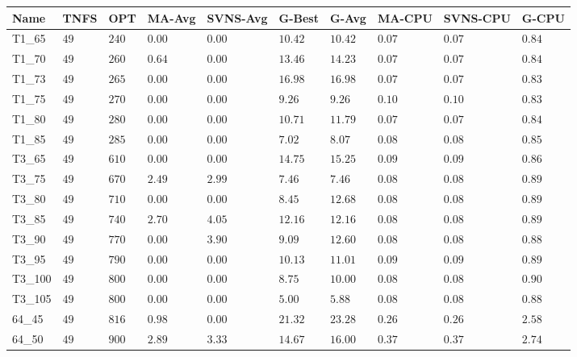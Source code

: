 \begin{center}
\begin{table}[]
\centering
\begin{tabular}{|lll|l|l|ll|lll|}
\hline
Name    & TNFS    & OPT    & MA-Avg &SVNS-Avg& G-Best  & G-Avg   & MA-CPU & SVNS-CPU & G-CPU \\
\hline
T1\_65   & $49  $ & $240 $ & $\bm{0.00}$ & $\bm{0.00}$ & $10.42$ & $10.42$ & $0.07$ & $0.07$   & $0.84$ \\
T1\_70   & $49  $ & $260 $ & $0.64$ & $\bm{0.00}$ & $13.46$ & $14.23$ & $0.07$ & $0.07$   & $0.84$ \\
T1\_73   & $49  $ & $265 $ & $\bm{0.00}$ & $\bm{0.00}$ & $16.98$ & $16.98$ & $0.07$ & $0.07$   & $0.83$ \\
T1\_75   & $49  $ & $270 $ & $\bm{0.00}$ & $\bm{0.00}$ & $9.26$  & $9.26$  & $0.10$ & $0.10$   & $0.83$ \\
T1\_80   & $49  $ & $280 $ & $\bm{0.00}$ & $\bm{0.00}$ & $10.71$ & $11.79$ & $0.07$ & $0.07$   & $0.84$ \\
T1\_85   & $49  $ & $285 $ & $\bm{0.00}$ & $\bm{0.00}$ & $7.02$  & $8.07$  & $0.08$ & $0.08$   & $0.85$ \\
\hline
T3\_65   & $49  $ & $610 $ & $\bm{0.00}$ & $\bm{0.00}$ & $14.75$ & $15.25$ & $0.09$ & $0.09$   & $0.86$ \\
T3\_75   & $49  $ & $670 $ & $2.49$ & $2.99$ & $7.46$  & $7.46$  & $0.08$ & $0.08$   & $0.89$ \\
T3\_80   & $49  $ & $710 $ & $\bm{0.00}$ & $\bm{0.00}$ & $8.45$  & $12.68$ & $0.08$ & $0.08$   & $0.89$ \\
T3\_85   & $49  $ & $740 $ & $2.70$ & $4.05$ & $12.16$ & $12.16$ & $0.08$ & $0.08$   & $0.89$ \\
T3\_90   & $49  $ & $770 $ & $\bm{0.00}$ & $3.90$ & $9.09$  & $12.60$ & $0.08$ & $0.08$   & $0.88$ \\
T3\_95   & $49  $ & $790 $ & $\bm{0.00}$ & $\bm{0.00}$ & $10.13$ & $11.01$ & $0.09$ & $0.09$   & $0.89$ \\
T3\_100  & $49  $ & $800 $ & $\bm{0.00}$ & $\bm{0.00}$ & $8.75$  & $10.00$ & $0.08$ & $0.08$   & $0.90$ \\
T3\_105  & $49  $ & $800 $ & $\bm{0.00}$ & $\bm{0.00}$ & $5.00$  & $5.88$  & $0.08$ & $0.08$   & $0.88$ \\
\hline
64\_45   & $49  $ & $816 $ & $0.98$ & $\bm{0.00}$ & $21.32$ & $23.28$ & $0.26$ & $0.26$   & $2.58$ \\
64\_50   & $49  $ & $900 $ & $2.89$ & $3.33$ & $14.67$ & $16.00$ & $0.37$ & $0.37$   & $2.74$ \\

\end{tabular}
\end{table}
\end{center}
